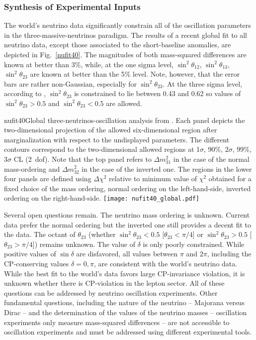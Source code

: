\subsubsection{Synthesis of Experimental Inputs} 

The world's neutrino data significantly constrain all of the oscillation parameters in the three-massive-neutrinos paradigm. The results of a recent global fit \cite{Esteban:2018azc} to all neutrino data, except those associated to the short-baseline anomalies, are depicted in Fig.~\ref{nufit40}. The magnitudes of both mass-squared differences are known at better than 3\%, while, at the one sigma level, $\sin^2\theta_{12}$, $\sin^2\theta_{13}$, $\sin^2\theta_{23}$ are known at better than the 5\% level. Note, however, that the error bars are rather non-Gaussian, especially for $\sin^2\theta_{23}$. At the three sigma level,  according to \cite{Esteban:2018azc}, $\sin^2\theta_{23}$ is constrained to lie between 0.43 and 0.62 so values of $\sin^2\theta_{23}>0.5$ and $\sin^2\theta_{23}<0.5$ are allowed.
\begin{dunefigure}{nufit40}{Global three-neutrinos-oscillation analysis from \cite{Esteban:2018azc}. Each panel depicts the two-dimensional projection of the allowed six-dimensional region after marginalization with respect to the undisplayed parameters. The different contours correspond to the two-dimensional allowed regions at 1$\sigma$, 90\%, 2$\sigma$, 99\%, 3$\sigma$ CL (2~dof). Note that the top panel refers to $\Delta m^2_{31}$ in the case of the normal mass-ordering and $\Delta m^2_{32}$ in the case of the inverted one. The regions in the lower four panels are defined using $\Delta \chi^2$ relative to minimum value of $\chi^2$ obtained for a fixed choice of the mass ordering, normal ordering on the left-hand-side, inverted ordering on the right-hand-side.
}
  \texttt{[image: nufit40\_global.pdf]}
\end{dunefigure}

Several open questions remain. The neutrino mass ordering is unknown. Current data prefer the normal ordering but the inverted one still provides a decent fit to the data. The octant of $\theta_{23}$ (whether $\sin^2\theta_{23}<0.5$ [$\theta_{23}<\pi/4$] or $\sin^2\theta_{23}>0.5$ [$\theta_{23}>\pi/4$]) remains unknown. The value of $\delta$ is only poorly constrained. While positive values of $\sin\delta$ are disfavored, all values between $\pi$ and $2\pi$, including the CP-conserving values $\delta=0,\pi$, are consistent with the world's neutrino data. While the best fit to the world's data favors large CP-invariance violation, it is unknown whether there is CP-violation in the lepton sector. All of these questions can be addressed by neutrino oscillation experiments. Other fundamental questions, including the nature of the neutrino -- Majorana versus Dirac -- and the determination of the values of the neutrino masses -- oscillation experiments only measure mass-squared differences -- are not accessible to oscillation experiments and must be addressed using different experimental tools.  

